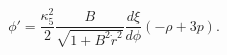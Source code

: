 \begin{equation}
\phi'=\frac{\kappa_5^2}{2}\frac{B}{\sqrt{1 + 
B^2 \dot r^2}}\frac{d\xi}{d\phi}(-\rho +3p).
\end{equation}

